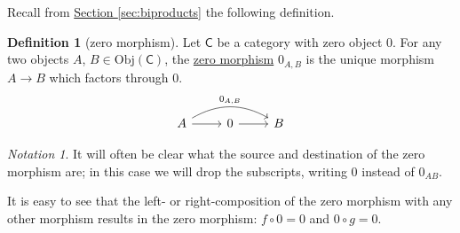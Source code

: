 \documentclass[a4paper]{report}
\newcommand{\defn}[1]{\ul{#1}}
\newcommand{\Obj}{\mathrm{Obj}}
\theoremstyle{definition}
\newtheorem{definition}{Definition}[section]
\theoremstyle{plain}
\theoremstyle{remark}
\newtheorem{notation}{Notation}[section]
\begin{document}
Recall from \hyperref[sec:biproducts]{Section \ref*{sec:biproducts}} the following definition.

\begin{definition}[zero morphism]
  \label{def:zeromorphism}
  Let $\mathsf{C}$ be a category with zero object $0$. For any two objects $A$, $B \in \Obj(\mathsf{C})$, the \defn{zero morphism} $0_{A,B}$ is the unique morphism $A \to B$ which factors through $0$.
  \begin{equation*}
    \begin{tikzcd}
      A
      \arrow[rr, bend left, "0_{A, B}"]
      \arrow[r]
      & 0
      \arrow[r]
      & B
    \end{tikzcd}
  \end{equation*}
\end{definition}

\begin{notation}
  It will often be clear what the source and destination of the zero morphism are; in this case we will drop the subscripts, writing $0$ instead of $0_{AB}$.
\end{notation}

It is easy to see that the left- or right-composition of the zero morphism with any other morphism results in the zero morphism: $f \circ 0 = 0$ and $0 \circ g = 0$.
\end{document}
